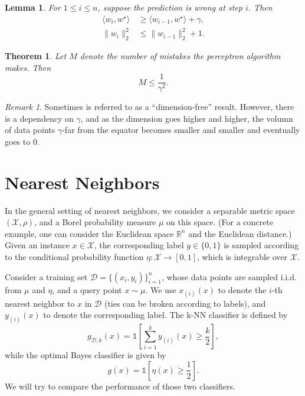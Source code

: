 \documentclass[openany]{book}
\newtheorem{lemma}{Lemma}[chapter]
\newtheorem{theorem}{Theorem}[chapter]
\theoremstyle{definition}
\theoremstyle{remark}
\newtheorem*{remark}{Remark}
\begin{document}
\begin{lemma}
    For $1\le i\le n$, suppose the prediction is wrong at step $i$. Then
    \begin{align*}
        \langle w_i,w^{\star}\rangle & \ge \langle w_{i-1},w^{\star}\rangle+\gamma, \\
        \|w_i\|_2^2 & \le\|w_{i-1}\|_2^2+1.
    \end{align*}
\end{lemma}
\begin{theorem}\label{thm:perceptron}
    Let $M$ denote the number of mistakes the perceptron algorithm makes. Then
    \begin{equation*}
        M\le \frac{1}{\gamma^2}.
    \end{equation*}
\end{theorem}
\begin{remark}
    Sometimes  is referred to as a ``dimension-free'' result. However, there is a dependency on $\gamma$, and as the dimension goes higher and higher, the volumn of data points $\gamma$-far from the equator becomes smaller and smaller and eventually goes to $0$.
\end{remark}

\chapter{Nearest Neighbors}
In the general setting of nearest neighbors, we consider a separable metric space $(\mathcal{X},\rho)$, and a Borel probability measure $\mu$ on this space. (For a concrete example, one can consider the Euclidean space $\mathbb{R}^n$ and the Euclidean distance.) Given an instance $x\in \mathcal{X}$, the corresponding label $y\in\{0,1\}$ is sampled according to the conditional probability function $\eta:\mathcal{X}\to[0,1]$, which is integrable over $\mathcal{X}$.

Consider a training set $\mathcal{D}=\{(x_i,y_i)\}_{i=1}^n$, whose data points are sampled i.i.d. from $\mu$ and $\eta$, and a query point $x\sim\mu$. We use $x_{(i)}(x)$ to denote the $i$-th nearest neighbor to $x$ in $\mathcal{D}$ (ties can be broken according to labels), and $y_{(i)}(x)$ to denote the corresponding label. The k-NN classifier is defined by
\begin{equation*}
    g_{\mathcal{D},k}(x)=\mathds{1}\left[\sum_{i=1}^{k}y_{(i)}(x)\ge \frac{k}{2}\right],
\end{equation*}
while the optimal Bayes classifier is given by
\begin{equation*}
    g(x)=\mathds{1}\left[\eta(x)\ge \frac{1}{2}\right].
\end{equation*}
We will try to compare the performance of those two classifiers.
\end{document}
